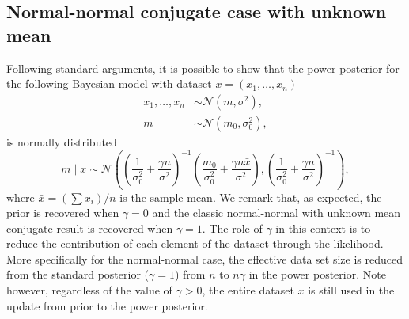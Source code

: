 \documentclass{article}
\begin{document}
\subsection{Normal-normal conjugate case with unknown mean}
Following standard arguments, it is possible to show that the power posterior
for the following Bayesian model with dataset $x = (x_1, \ldots, x_n)$
\begin{subequations}
\begin{align}
x_1, \ldots, x_n &\sim \mathcal{N}(m, \sigma^2), \\
m &\sim \mathcal{N}(m_0, \sigma_0^2),
\end{align}
\end{subequations}
is normally distributed
\begin{equation}
m \;|\; x \sim \mathcal{N} \left( \left( \frac{1}{\sigma_0^2} + \frac{\gamma n}{\sigma^2} \right)^{-1} \left(\frac{m_0}{\sigma_0^2} + \frac{\gamma n \bar{x}}{\sigma^2}  \right), \left( \frac{1}{\sigma_0^2} + \frac{\gamma n}{\sigma^2} \right)^{-1} \right),
\end{equation}
where $\bar{x} = (\sum x_i)/ n$ is the sample mean. We remark that, as
expected, the prior is recovered when $\gamma = 0$ and the classic
normal-normal with unknown mean conjugate result is recovered when $\gamma =
1$. The role of $\gamma$ in this context is to reduce the contribution of each
element of the dataset through the likelihood. More specifically for the
normal-normal case, the effective data set size is reduced from the standard
posterior ($\gamma = 1$) from $n$ to $n \gamma$ in the power posterior. Note
however, regardless of the value of $\gamma > 0$, the entire dataset $x$ is
still used in the update from prior to the power posterior.
\end{document}
